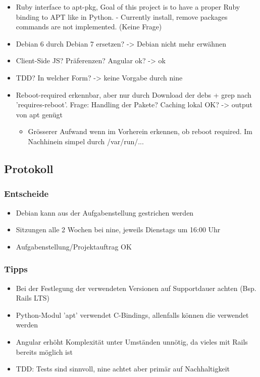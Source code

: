 \documentclass[class=scrbook,crop=false]{standalone}
\begin{document}
    \begin{itemize}
        \item Ruby interface to apt-pkg, Goal of this project is to have a proper Ruby binding to APT like in Python. - Currently install, remove packages commands are not implemented. (Keine Frage)
        \item Debian 6 durch Debian 7 ersetzen? -> Debian nicht mehr erwähnen
        \item Client-Side JS? Präferenzen? Angular ok? -> ok
        \item TDD? In welcher Form? -> keine Vorgabe durch \gls{nine}
        \item Reboot-required erkennbar, aber nur durch Download der debs + grep nach 'requires-reboot'. Frage: Handling der Pakete? Caching lokal OK? -> output von apt genügt
        \begin{itemize}
            \item Grösserer Aufwand wenn im Vorherein erkennen, ob reboot required. Im Nachhinein simpel durch /var/run/...
        \end{itemize}
    \end{itemize}
    
    \subsection*{Protokoll}
    
    \subsubsection*{Entscheide}
    
    \begin{itemize}
        \item Debian kann aus der Aufgabenstellung gestrichen werden
        \item Sitzungen alle 2 Wochen bei \gls{nine}, jeweils Dienstags um 16:00 Uhr
        \item Aufgabenstellung/Projektauftrag OK
    \end{itemize}
    
    \subsubsection*{Tipps}
    
	\begin{itemize}
        \item Bei der Festlegung der verwendeten Versionen auf Supportdauer achten (Bsp. Rails LTS)
        \item Python-Modul 'apt' verwendet C-Bindings, allenfalls können die verwendet werden
        \item Angular erhöht Komplexität unter Umständen unnötig, da vieles mit Rails bereits möglich ist
        \item TDD: Tests sind sinnvoll, \gls{nine} achtet aber primär auf Nachhaltigkeit
    \end{itemize}
    
\end{document}
